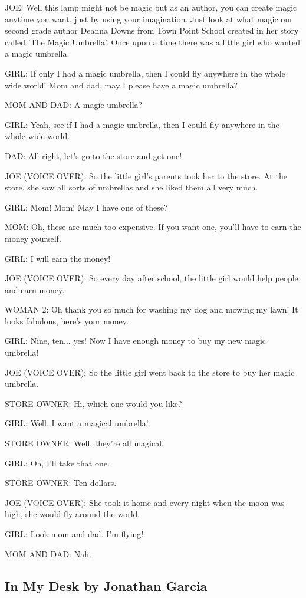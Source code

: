JOE: Well this lamp might not be magic but as an author, you can create magic anytime you want, just by using your imagination.
Just look at what magic our second grade author Deanna Downs from Town Point School created in her story called 'The Magic Umbrella'.
Once upon a time there was a little girl who wanted a magic umbrella.

GIRL: If only I had a magic umbrella, then I could fly anywhere in the whole wide world!
Mom and dad, may I please have a magic umbrella?

MOM AND DAD: A magic umbrella?

GIRL: Yeah, see if I had a magic umbrella, then I could fly anywhere in the whole wide world.

DAD: All right, let's go to the store and get one!

JOE (VOICE OVER): So the little girl's parents took her to the store.
At the store, she saw all sorts of umbrellas and she liked them all very much.

GIRL: Mom! Mom!
May I have one of these?

MOM: Oh, these are much too expensive.
If you want one, you'll have to earn the money yourself.

GIRL: I will earn the money!

JOE (VOICE OVER): So every day after school, the little girl would help people and earn money.

WOMAN 2: Oh thank you so much for washing my dog and mowing my lawn!
It looks fabulous, here's your money.

GIRL: Nine, ten... yes!
Now I have enough money to buy my new magic umbrella!

JOE (VOICE OVER): So the little girl went back to the store to buy her magic umbrella.

STORE OWNER: Hi, which one would you like?

GIRL: Well, I want a magical umbrella!

STORE OWNER: Well, they're all magical.

GIRL: Oh, I'll take that one.

STORE OWNER: Ten dollars.

JOE (VOICE OVER): She took it home and every night when the moon was high, she would fly around the world.

GIRL: Look mom and dad.
I'm flying!

MOM AND DAD: Nah.

\subsection{In My Desk by Jonathan Garcia}

